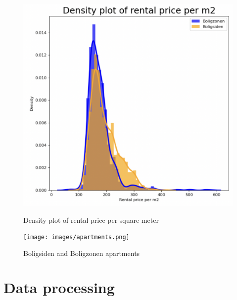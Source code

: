 \documentclass{article}
\begin{document}
\begin{figure}
    \centering
    \begin{minipage}{0.4\textwidth}
        \centering
        \includegraphics[width=1\textwidth]{images/DensityPlot.png} %
        \caption{Density plot of rental price per square meter}
    \end{minipage}\hfill
    \begin{minipage}{0.6\textwidth}
        \centering
        \texttt{[image: images/apartments.png]} %
        \caption{Boligsiden and Boligzonen apartments}
    \end{minipage}
\end{figure}



\section{Data processing}
\end{document}
